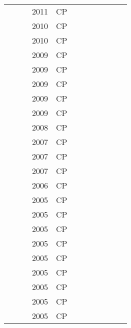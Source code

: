 \documentclass[a4paper]{article}
\begin{document}
{\begin{longtable}{p{3cm}p{6cm}rrcrlcccp{1.5cm}l}
& \href{papers/KameugneFSN11.pdf}{} & \cite{KameugneFSN11} & 2011 & CP & & & & & & & \\
& \href{papers/LombardiM10.pdf}{} & \cite{LombardiM10} & 2010 & CP & & & & & & & \\
& \href{papers/SchuttW10.pdf}{} & \cite{SchuttW10} & 2010 & CP & & & & & & & \\
& \href{papers/Baptiste09.pdf}{} & \cite{Baptiste09} & 2009 & CP & & & & & & & \\
& \href{papers/GrimesHM09.pdf}{} & \cite{GrimesHM09} & 2009 & CP & & & & & & & \\
& \href{papers/LombardiM09.pdf}{} & \cite{LombardiM09} & 2009 & CP & & & & & & & \\
& \href{papers/SchuttFSW09.pdf}{} & \cite{SchuttFSW09} & 2009 & CP & & & & & & & \\
& \href{papers/Vilim09.pdf}{} & \cite{Vilim09} & 2009 & CP & & & & & & & \\
& \href{papers/MouraSCL08.pdf}{} & \cite{MouraSCL08} & 2008 & CP & & & & & & & \\
& \href{papers/DavenportKRSH07.pdf}{} & \cite{DavenportKRSH07} & 2007 & CP & & & & & & & \\
& \href{papers/GarganiR07.pdf}{} & \cite{GarganiR07} & 2007 & CP & & & & & & & \\
& \href{papers/KrogtLPHJ07.pdf}{} & \cite{KrogtLPHJ07} & 2007 & CP & & & & & & & \\
& \href{papers/KhemmoudjPB06.pdf}{} & \cite{KhemmoudjPB06} & 2006 & CP & & & & & & & \\
& \href{papers/ArtiouchineB05.pdf}{} & \cite{ArtiouchineB05} & 2005 & CP & & & & & & & \\
& \href{papers/FortinZDF05.pdf}{} & \cite{FortinZDF05} & 2005 & CP & & & & & & & \\
& \href{papers/cp-Hooker05.pdf}{} & \cite{cp-Hooker05} & 2005 & CP & & & & & & & \\
& \href{papers/DilkinaDH05.pdf}{} & \cite{DilkinaDH05} & 2005 & CP & & & & & & & \\
& \href{papers/AbrilSB05.pdf}{} & \cite{AbrilSB05} & 2005 & CP & & & & & & & \\
& \href{papers/CarchraeBF05.pdf}{} & \cite{CarchraeBF05} & 2005 & CP & & & & & & & \\
& \href{papers/WuBB05.pdf}{} & \cite{WuBB05} & 2005 & CP & & & & & & & \\
& \href{papers/HebrardTW05.pdf}{} & \cite{HebrardTW05} & 2005 & CP & & & & & & & \\
& \href{papers/KovacsEKV05.pdf}{} & \cite{KovacsEKV05} & 2005 & CP & & & & & & & \\

\end{longtable}}
\end{document}
